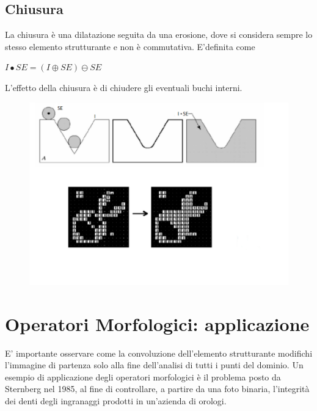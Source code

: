 \subsection{Chiusura}

La chiusura è una dilatazione seguita da una erosione, dove si considera sempre lo stesso elemento strutturante e non è
commutativa.
E'definita come

\begin{center}
    $I \bullet SE = (I \oplus SE) \ominus SE$
\end{center}

L'effetto della chiusura è di chiudere gli eventuali buchi interni.

\begin{figure}[H]
    \centering
    \includegraphics[width=\linewidth, keepaspectratio]{capitoli/immagini/imgs/chiusura.png}
\end{figure}

\newpage
\section{Operatori Morfologici: applicazione}

E' importante osservare come la convoluzione dell'elemento strutturante modifichi l'immagine di partenza solo alla fine
dell'analisi di tutti i punti del dominio. Un esempio di applicazione degli operatori morfologici è il problema posto da Sternberg nel 1985, al fine di controllare, a
partire da una foto binaria, l'integrità dei denti degli ingranaggi prodotti in un'azienda di orologi.

